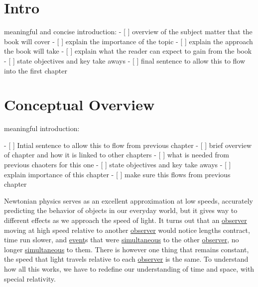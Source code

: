 \mainmatter
\chapter{Intro}

meaningful and concise introduction:
- [ ] overview of the subject matter that the book will cover
- [ ] explain the importance of the topic
- [ ] explain the approach the book will take
- [ ] explain what the reader can expect to gain from the book
- [ ] state objectives and key take aways
- [ ] final sentence to allow this to flow into the first chapter



\chapter{Conceptual Overview}

meaningful introduction:

- [ ] Intial sentence to allow this to flow from previous chapter
- [ ] brief overview of chapter and how it is linked to other chapters
    - [ ] what is needed from previous chaoters for this one
- [ ] state objectives and key take aways
- [ ] explain importance of this chapter
- [ ] make sure this flows from previous chapter

Newtonian physics serves as an excellent approximation at low speeds, accurately predicting the behavior of objects in our everyday world, but it gives way to different effects as we approach the speed of light. It turns out that an \hyperlink{def-observer}{observer} moving at high speed relative to another \hyperlink{def-observer}{observer} would notice lengths contract, time run slower, and \hyperlink{def-event}{event}s that were \hyperlink{def-simultaneity}{simultaneous} to the other \hyperlink{def-observer}{observer}, no longer \hyperlink{def-simultaneity}{simultaneous} to them. There is however one thing that remains constant, the speed that light travels relative to each \hyperlink{def-observer}{observer} is the same. To understand how all this works, we have to redefine our understanding of time and space, with special relativity.

